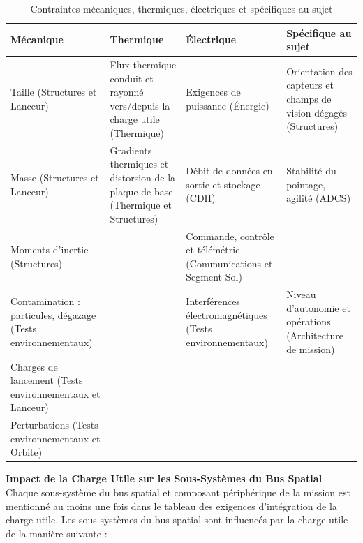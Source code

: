 \begin{table}[h]
    \centering
    \renewcommand{\arraystretch}{1.2} %
    \begin{tabular}{|l|l|l|l|}
        \hline
        \textbf{Mécanique} & \textbf{Thermique} & \textbf{Électrique} & \textbf{Spécifique au sujet} \\
        \hline
        Taille (Structures et Lanceur) & Flux thermique conduit et rayonné vers/depuis la charge utile (Thermique) & Exigences de puissance (Énergie) & Orientation des capteurs et champs de vision dégagés (Structures) \\
        \hline
        Masse (Structures et Lanceur) & Gradients thermiques et distorsion de la plaque de base (Thermique et Structures) & Débit de données en sortie et stockage (CDH) & Stabilité du pointage, agilité (ADCS) \\
        \hline
        Moments d'inertie (Structures) &  & Commande, contrôle et télémétrie (Communications et Segment Sol) &  \\
        \hline
        Contamination : particules, dégazage (Tests environnementaux) &  & Interférences électromagnétiques (Tests environnementaux) & Niveau d'autonomie et opérations (Architecture de mission) \\
        \hline
        Charges de lancement (Tests environnementaux et Lanceur) &  &  &  \\
        \hline
        Perturbations (Tests environnementaux et Orbite) &  &  &  \\
        \hline
    \end{tabular}
    \caption{Contraintes mécaniques, thermiques, électriques et spécifiques au sujet}
    \label{tab:mechanical_constraints}
\end{table}
\textbf{Impact de la Charge Utile sur les Sous-Systèmes du Bus Spatial}
Chaque sous-système du bus spatial et composant périphérique de la mission est mentionné au moins une fois dans le tableau des exigences d'intégration de la charge utile. Les sous-systèmes du bus spatial sont influencés par la charge utile de la manière suivante :
